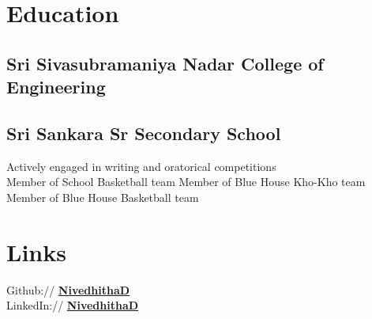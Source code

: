 \documentclass[]{deedy-resume-openfont}
\begin{document}
%
%

%
%

%
%

\begin{minipage}[t]{0.33\textwidth} 


\section{Education} 

\subsection{Sri Sivasubramaniya Nadar College of Engineering}
\sectionsep

\subsection{Sri Sankara Sr Secondary School}
Actively engaged in writing and oratorical competitions \\
Member of School Basketball team
Member of Blue House Kho-Kho team
Member of Blue House Basketball team
\sectionsep


\section{Links}
Github:// \href{https://github.com/nive927}{\bf NivedhithaD} \\
LinkedIn://  \href{https://www.linkedin.com/in/nivedhitha-d-0bb67b1b0}{\bf NivedhithaD} \\


\end{minipage}
\end{document}
